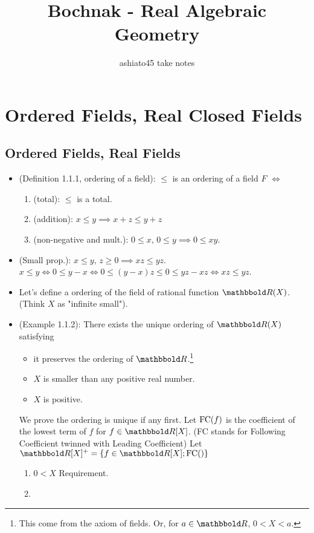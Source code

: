 \documentclass[9pt]{ltjsarticle}
\title{Bochnak - Real Algebraic Geometry}
\author{ashiato45 take notes}
\begin{document}
\maketitle

\section{Ordered Fields, Real Closed Fields}
\label{sec:Ordered Fields, Real Closed Fields}
\subsection{Ordered Fields, Real Fields}
\label{sub:Ordered Fields, Real Fields}
\begin{itemize}
  \item (Definition 1.1.1, ordering of a field):
  $\le$ is an ordering of a field $F$
  $\iff$
  \begin{enumerate}
    \item (total): $\le$ is a total.
    \item (addition): $x\le y \implies x+z \le y+z$
    \item (non-negative and mult.): $0\le x,\, 0\le y\implies 0\le xy$.
  \end{enumerate}
  \item (Small prop.):
  $x\le y,\, z\ge 0 \implies xz\le yz$. \pf
  $x\le y \iff 0\le y-x \iff 0\le (y-x)z \le 0\le yz-xz \iff xz \le yz$.
  \item
  Let's define a ordering of the field of rational function $\R(X)$.
  (Think $X$ as "infinite small").
  \item
  (Example 1.1.2):
  There exists the unique ordering of $\R (X)$ satisfying
  \begin{itemize}
    \item it preserves the ordering of $\R$.\footnote{
    This come from the axiom of fields.
    Or, for $a\in \R$, $0 < X < a$.
    }
    \item $X$ is smaller than any positive real number.
    \item $X$ is positive.
  \end{itemize}
  \pf
  We prove the ordering is unique if any first.
  Let $\mathrm{FC}(f)$ is the coefficient of the lowest term of $f$ for $f \in \R[X]$.
  (FC stands for Following Coefficient twinned with Leading Coefficient)
  Let $\R [X]^+ = \set{f\in \R [X]; \FC()}$
  \begin{enumerate}
    \item
    $0<X$ \pf Requirement.
    \item

\end{enumerate}
\end{itemize}
\end{document}
